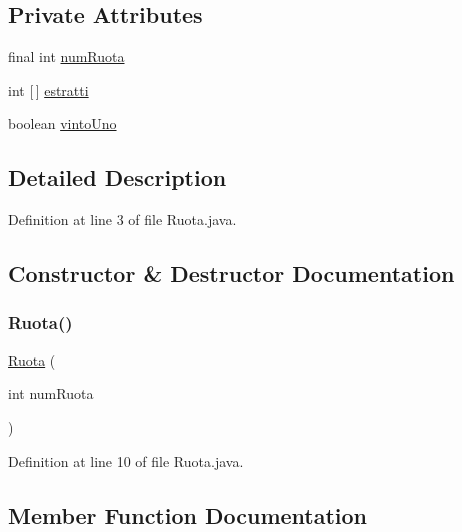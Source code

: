 \subsection*{Private Attributes}
\begin{DoxyCompactItemize}
\item 
final int \mbox{\hyperlink{classmain_1_1_ruota_ab7691d77fe75980e207c3c89cf90b7da}{num\+Ruota}}
\item 
int \mbox{[}$\,$\mbox{]} \mbox{\hyperlink{classmain_1_1_ruota_a7be91eda031da75cc73826a2a0196c6c}{estratti}}
\item 
boolean \mbox{\hyperlink{classmain_1_1_ruota_a208227a3e29bd1d579feb423a9948700}{vinto\+Uno}}
\end{DoxyCompactItemize}


\subsection{Detailed Description}


Definition at line 3 of file Ruota.\+java.



\subsection{Constructor \& Destructor Documentation}
\mbox{\label{classmain_1_1_ruota_a94f55777c902bce8766a98bb0423b7a0}} 
\subsubsection{\texorpdfstring{Ruota()}{Ruota()}}
{\footnotesize\ttfamily \mbox{\hyperlink{classmain_1_1_ruota}{Ruota}} (\begin{DoxyParamCaption}\item[{int}]{num\+Ruota }\end{DoxyParamCaption})}



Definition at line 10 of file Ruota.\+java.



\subsection{Member Function Documentation}
\mbox{\label{classmain_1_1_ruota_a3fbe06494cd4fa2d6fd022c2e84e9156}} 
